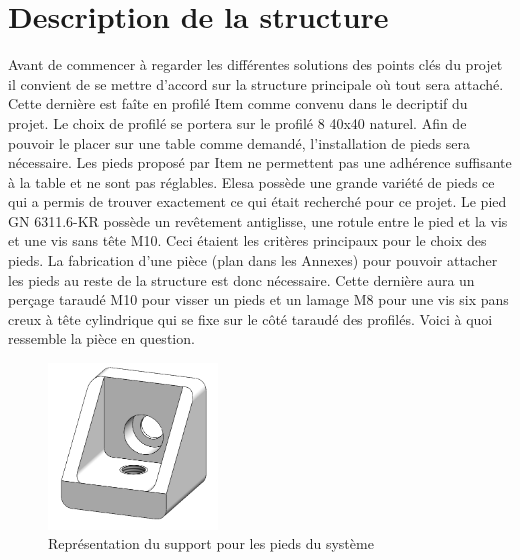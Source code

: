 \section{Description de la structure}\label{sec:DescStruct}
Avant de commencer à regarder les différentes solutions des points clés du projet il convient de se mettre d'accord
sur la structure principale où tout sera attaché. Cette dernière est faîte en profilé Item \cite{Item} comme convenu dans le decriptif
du projet. Le choix de profilé se portera sur le profilé 8 40x40 naturel. Afin de pouvoir le placer sur une table comme demandé, l'installation de pieds sera nécessaire. Les pieds proposé par Item ne
permettent pas une adhérence suffisante à la table et ne sont pas réglables. Elesa \cite{Elesa} possède une grande variété de pieds ce qui
a permis de trouver exactement ce qui était recherché pour ce projet. Le pied GN 6311.6-KR possède un revêtement antiglisse, une rotule entre le pied
et la vis et une vis sans tête M10. Ceci étaient les critères principaux pour le choix des pieds. La fabrication d'une pièce (plan dans les Annexes) pour pouvoir attacher
les pieds au reste de la structure est donc nécessaire. Cette dernière aura un perçage taraudé M10 pour visser un pieds et un lamage M8 pour
une vis six pans creux à tête cylindrique qui se fixe sur le côté taraudé des profilés. Voici à quoi ressemble la pièce en question.

\begin{figure}[H]
  \centering
  \includegraphics[width = 0.4\textwidth]{assets/figures/SupportPieds.png}
  \caption{Représentation du support pour les pieds du système}
  \label{fig:SupPieds}
\end{figure}

